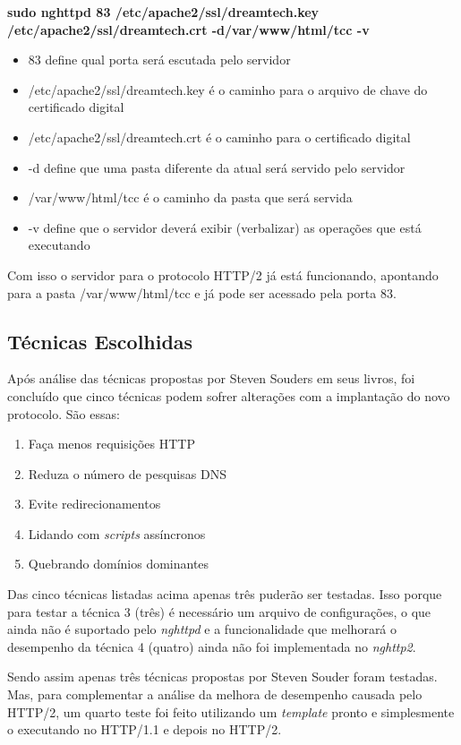 \textbf{sudo nghttpd 83 /etc/apache2/ssl/dreamtech.key /etc/apache2/ssl/dreamtech.crt -d/var/www/html/tcc -v}

\begin{itemize}
	\item 83 define qual porta será escutada pelo servidor
	\item /etc/apache2/ssl/dreamtech.key é o caminho para o arquivo de chave do certificado digital
	\item /etc/apache2/ssl/dreamtech.crt é o caminho para o certificado digital
	\item -d define que uma pasta diferente da atual será servido pelo servidor
	\item /var/www/html/tcc é o caminho da pasta que será servida
	\item -v define que o servidor deverá exibir (verbalizar) as operações que está executando
\end{itemize}

Com isso o servidor para o protocolo HTTP/2 já está funcionando, apontando para a pasta /var/www/html/tcc e já pode ser acessado pela porta 83.

\subsection{Técnicas Escolhidas}
\label{tecnicasescolhidas}

Após análise das técnicas propostas por Steven Souders em seus livros, foi concluído que cinco técnicas podem sofrer alterações com a implantação do novo protocolo. São essas:

\begin{enumerate}
	\item Faça menos requisições HTTP
	\item Reduza o número de pesquisas DNS
	\item Evite redirecionamentos
	\item Lidando com \textit{scripts} assíncronos
	\item Quebrando domínios dominantes
\end{enumerate}

Das cinco técnicas listadas acima apenas três puderão ser testadas. Isso porque para testar a técnica 3 (três) é necessário um arquivo de configurações, o que ainda não é suportado pelo \textit{nghttpd} e a funcionalidade que melhorará o desempenho da técnica 4 (quatro) ainda não foi implementada no \textit{nghttp2}.

Sendo assim apenas três técnicas propostas por Steven Souder foram testadas. Mas, para complementar a análise da melhora de desempenho causada pelo HTTP/2, um quarto teste foi feito utilizando um \textit{template} pronto e simplesmente o executando no HTTP/1.1 e depois no HTTP/2.

